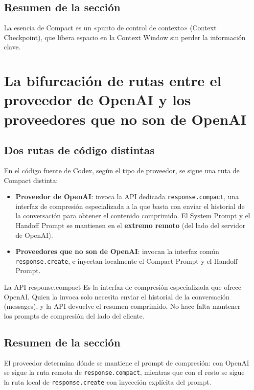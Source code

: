 \documentclass[a4paper]{article}
\begin{document}
\subsection{Resumen de la sección}

La esencia de Compact es un «punto de control de contexto» (Context Checkpoint), que libera espacio en la Context Window sin perder la información clave.

\section{La bifurcación de rutas entre el proveedor de OpenAI y los proveedores que no son de OpenAI}

\subsection{Dos rutas de código distintas}

En el código fuente de Codex, según el tipo de proveedor, se sigue una ruta de Compact distinta:

\begin{itemize}
    \item \textbf{Proveedor de OpenAI}: invoca la API dedicada \texttt{response.compact}, una interfaz de compresión especializada a la que basta con enviar el historial de la conversación para obtener el contenido comprimido. El System Prompt y el Handoff Prompt se mantienen en el \textbf{extremo remoto} (del lado del servidor de OpenAI).
    \item \textbf{Proveedores que no son de OpenAI}: invocan la interfaz común \texttt{response.create}, e inyectan localmente el Compact Prompt y el Handoff Prompt.
\end{itemize}

\begin{knowledgebox}{La API response.compact}
Es la interfaz de compresión especializada que ofrece OpenAI. Quien la invoca solo necesita enviar el historial de la conversación (messages), y la API devuelve el resumen comprimido. No hace falta mantener los prompts de compresión del lado del cliente.
\end{knowledgebox}

\subsection{Resumen de la sección}

El proveedor determina dónde se mantiene el prompt de compresión: con OpenAI se sigue la ruta remota de \texttt{response.compact}, mientras que con el resto se sigue la ruta local de \texttt{response.create} con inyección explícita del prompt.
\end{document}
